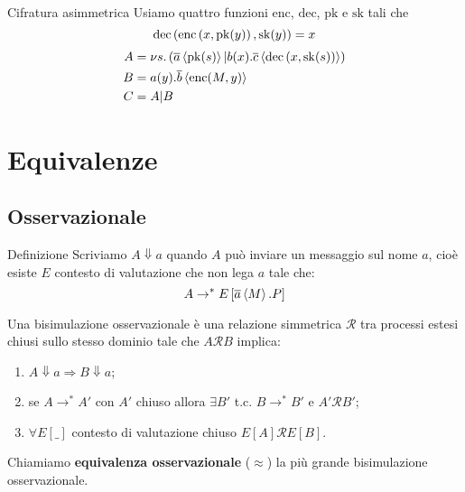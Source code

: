 \begin{frame}{Cifratura asimmetrica}
  Usiamo quattro funzioni $\mathrm{enc}$, $\mathrm{dec}$,
  $\mathrm{pk}$ e $\mathrm{sk}$ tali che
  \[ \mathrm{dec}\left(\mathrm{enc}\left(x,\mathrm{pk}(y)\right),\mathrm{sk}(y)\right)
    = x \]
  \begin{align*}
    A &= \nu s.\left( \overline{a}\left<\mathrm{pk}(s)\right>|
    b(x).\overline{c}\left<\mathrm{dec}\left( x,\mathrm{sk}(s) \right) \right> \right) \\
    B &= a(y).\overline{b}\left<\mathrm{enc}(M,y)\right> \\
    C &= A|B   
  \end{align*}
  \vfill
\end{frame}

\section{Equivalenze}

\subsection{Osservazionale}

\begin{frame}{Definizione}
  Scriviamo $A \Downarrow a$ quando $A$ pu\`o inviare un messaggio sul
  nome $a$, cio\`e esiste $E$ contesto di valutazione che non lega $a$
  tale che:
  \[ A \rightarrow ^* E\left[ \overline{a}\left<M\right>.P\right] \]

  \begin{mydef}
    Una bisimulazione osservazionale \`e una relazione simmetrica
    $\mathcal{R}$ tra processi estesi chiusi sullo stesso dominio tale
    che $A \mathcal{R} B$ implica:
    \begin{enumerate}
    \item $A \Downarrow a \Rightarrow B \Downarrow a$;
    \item se $A \rightarrow ^* A'$ con $A'$ chiuso allora $\exists B'$
      t.c. $B \rightarrow ^* B'$ e $A' \mathcal{R} B'$;
    \item $\forall E[\_]$ contesto di valutazione chiuso $E[A]
      \mathcal{R} E[B]$.
    \end{enumerate}
    Chiamiamo \textbf{equivalenza osservazionale} ($\approx$) la pi\`u
    grande bisimulazione osservazionale.
  \end{mydef}
\end{frame}

